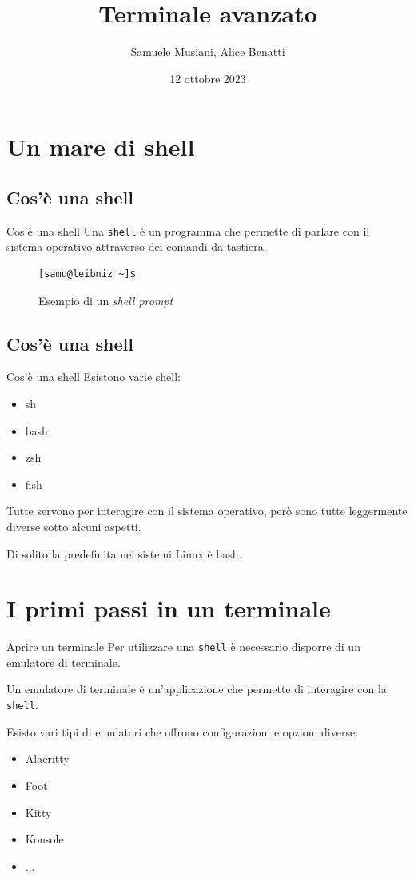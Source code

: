 \documentclass{beamer}
\title{Terminale avanzato}
\author{Samuele Musiani, Alice Benatti}
\institute{Università di Bologna, corso di Laurea in Informatica}
\date{12 ottobre 2023}
\begin{document}
\begin{frame} 
  \titlepage
\end{frame}

\section{Un mare di shell}

\subsection{Cos'è una shell}
\begin{frame}[fragile]{Cos'è una shell}
  Una \texttt{shell} è un programma che permette di parlare con il sistema 
  operativo attraverso dei comandi da tastiera.
  \pause

  \begin{figure}
        \begin{lstlisting}
[samu@leibniz ~]$
    \end{lstlisting}
    \caption{Esempio di un \textit{shell prompt}}
  \end{figure}
\end{frame}

\subsection{Cos'è una shell}
\begin{frame}[fragile]{Cos'è una shell}
  Esistono varie shell:
  \begin{itemize}
    \item sh
    \item bash
    \item zsh
    \item fish
  \end{itemize}
  Tutte servono per interagire con il sistema operativo, però sono tutte 
  leggermente diverse sotto alcuni aspetti.\medskip

  Di solito la predefinita nei sistemi Linux è bash.
\end{frame}

\section{I primi passi in un terminale}
\begin{frame}{Aprire un terminale}
  Per utilizzare una \texttt{shell} è necessario disporre di un emulatore di 
  terminale.\bigskip

  Un emulatore di terminale è un'applicazione che permette di interagire con
  la \texttt{shell}.\medskip

  Esisto vari tipi di emulatori che offrono configurazioni e opzioni diverse:
  \begin{itemize}
    \item Alacritty
    \item Foot
    \item Kitty
    \item Konsole
    \item ...
  \end{itemize}
\end{frame}
\end{document}
